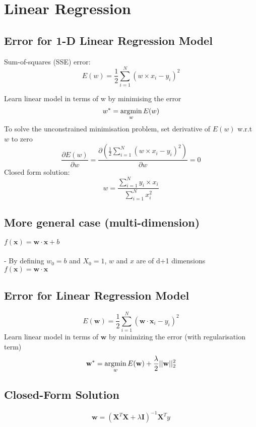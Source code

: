 \section{Linear Regression}
\subsection*{Error for 1-D Linear Regression Model}
Sum-of-squares (SSE) error:
\[E(w) = \frac{1}{2}\sum^N_{i=1}(w \times x_i - y_i)^2\]

Learn linear model in terms of w by minimising the error\\
\[w^* = \operatorname*{\arg\!\min}_w E(w)\]
To solve the unconstrained minimisation problem, set derivative of $E(w)$ w.r.t $w$ to zero
\[\frac{\partial E(w)}{\partial w} = \frac{\partial (\frac{1}{2}\sum^N_{i=1}(w \times x_i - y_i)^2)}{\partial w} = 0\]
Closed form solution:
\[w = \frac{\sum^N_{i=1} y_i \times x_i}{\sum^N_{i=1} x_i^2}\]
\subsection*{More general case (multi-dimension)}
$f(\mathbf{x}) = \mathbf{w}\cdot\mathbf{x} + b$\\\\
- By defining $w_0 = b$ and $X_0 = 1$, $w$ and $x$ are of d+1 dimensions\\
$f(\mathbf{x}) = \mathbf{w}\cdot\mathbf{x}$
\subsection*{Error for Linear Regression Model}
\[E(\mathbf{w}) = \frac{1}{2}\sum^N_{i=1}(\mathbf{w} \cdot \mathbf{x}_i - y_i)^2\]
Learn linear model in terms of $\mathbf{w}$ by minimizing the error (with regularisation term)
\[\mathbf{w^*} = \operatorname*{\arg\!\min}_w E(\mathbf{w}) + \frac{\lambda}{2}||\mathbf{w}||_2^2\]
\subsection*{Closed-Form Solution}
\[\mathbf{w} = (\mathbf{X}^T\mathbf{X} + \lambda \mathbf{I})^{-1}\mathbf{X}^Ty\]